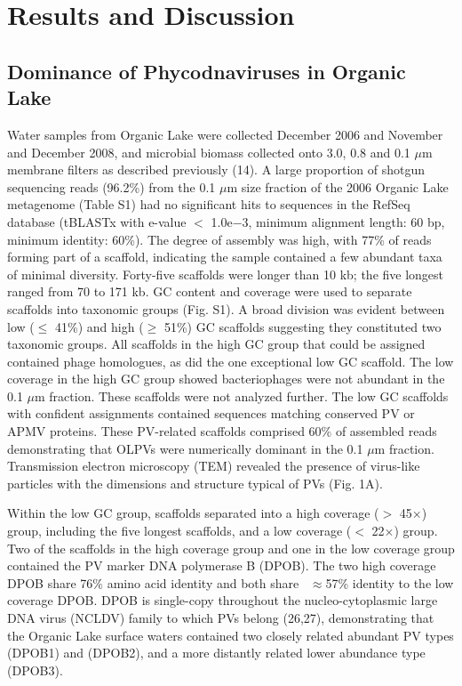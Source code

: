 \section{Results and Discussion}
\subsection{Dominance of Phycodnaviruses in Organic Lake}
Water samples from Organic Lake were collected December 2006 and November and December 2008, and microbial biomass collected onto 3.0, 0.8 and 0.1 $\mu$m membrane filters as described previously (14). 
A large proportion of shotgun sequencing reads (96.2\%) from the 0.1 $\mu$m size fraction of the 2006 Organic Lake metagenome (Table S1) had no significant hits to sequences in the RefSeq database 
(tBLASTx with e-value $<$ 1.0e$-$3, minimum alignment length: 60 bp, minimum identity: 60\%). 
The degree of assembly was high, with 77\% of reads forming part of a scaffold, indicating the sample contained a few abundant taxa of minimal diversity. 
Forty-five scaffolds were longer than 10 kb; the five longest ranged from 70 to 171 kb. 
GC content and coverage were used to separate scaffolds into taxonomic groups (Fig. S1). 
A broad division was evident between low ($\le$ 41\%) and high ($\ge$ 51\%) GC scaffolds suggesting they constituted two taxonomic groups. 
All scaffolds in the high GC group that could be assigned contained phage homologues, as did the one exceptional low GC scaffold. 
The low coverage in the high GC group showed bacteriophages were not abundant in the 0.1 $\mu$m fraction. 
These scaffolds were not analyzed further. 
The low GC scaffolds with confident assignments contained sequences matching conserved PV or APMV proteins. 
These PV-related scaffolds comprised 60\% of assembled reads demonstrating that OLPVs were numerically dominant in the 0.1 $\mu$m fraction. 
Transmission electron microscopy (TEM) revealed the presence of virus-like particles with the dimensions and structure typical of PVs (Fig. 1A).

Within the low GC group, scaffolds separated into a high coverage ($>$ 45$\times$) group, including the five longest scaffolds, and a low coverage ($<$ 22$\times$) group. 
Two of the scaffolds in the high coverage group and one in the low coverage group contained the PV marker DNA polymerase B (DPOB). 
The two high coverage DPOB share 76\% amino acid identity and both share ~$\approx$57\% identity to the low coverage DPOB. 
DPOB is single-copy throughout the nucleo-cytoplasmic large DNA virus (NCLDV) family to which PVs belong (26,27), 
demonstrating that the Organic Lake surface waters contained two closely related abundant PV types (DPOB1) and (DPOB2), and a more distantly related lower abundance type (DPOB3). 

